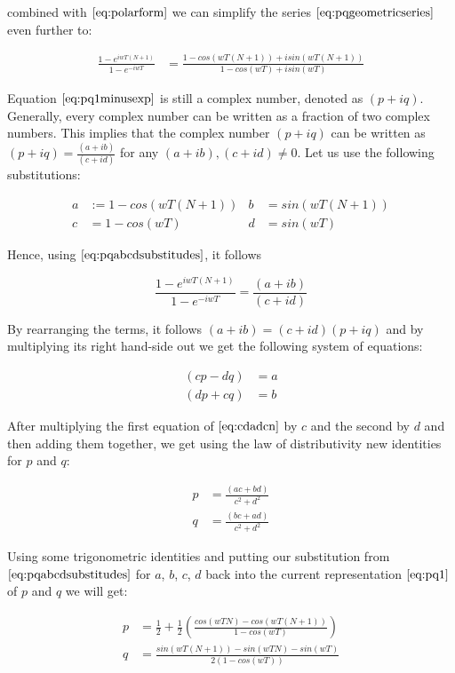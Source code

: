 combined with $\ref{eq:polarform}$ we can simplify the series $\ref{eq:pqgeometricseries}$ even further to:

\begin{align}
\frac{1-e^{iwT(N+1)}}{1-e^{-iwT}}
& =\frac{1-cos(wT(N+1)) + i sin(wT(N+1)) }{1-cos(wT) + i sin(wT)}
\label{eq:pq1minusexp}
\end{align}

Equation $\ref{eq:pq1minusexp}$ is still a complex number, denoted as $(p+iq)$. Generally, every complex number can be written as a fraction of two complex numbers. This implies that the complex number $(p+iq)$ can be written as $(p+iq) = \frac{(a+ib)}{(c+id)}$ for any $(a+ib), (c+id) \neq 0$. Let us use the following substitutions: 

\begin{align}
a& := 1 - cos(wT(N+1))&
b& =sin(wT(N+1)) \nonumber \\
c& =1-cos(wT)&
d& =sin(wT)
\label{eq:pqabcdsubstitudes}
\end{align}

Hence, using $\ref{eq:pqabcdsubstitudes}$, it follows 

\begin{equation}
  \frac{1-e^{iwT(N+1)}}{1-e^{-iwT}} = \frac{(a+ib)}{(c+id)}
\end{equation}

By rearranging the terms, it follows $(a+ib) = (c+id)(p+iq)$ and by multiplying its right hand-side out we get the following system of equations:

\begin{align}
(cp-dq)& =a \nonumber \\
(dp + cq)& =b
\label{eq:cdadcn}
\end{align}

After multiplying the first equation of $\ref{eq:cdadcn}$ by $c$ and the second by $d$ and then adding them together, we get using the law of distributivity new identities for $p$ and $q$:

\begin{align}
p& =\frac{(ac+bd)}{c^2 + d^2} \nonumber \\
q& =\frac{(bc+ad)}{c^2 + d^2}
\label{eq:pq1}
\end{align}

Using some trigonometric identities and putting our substitution from $\ref{eq:pqabcdsubstitudes}$ for $a$, $b$, $c$, $d$ back into the current representation $\ref{eq:pq1}$ of $p$ and $q$ we will get:

\begin{align}
p& =\frac{1}{2}+\frac{1}{2}\left(\frac{cos(wTN)-cos(wT(N+1))}{1-cos(wT)}\right) \nonumber \\
q& =\frac{sin(wT(N+1))-sin(wTN)-sin(wT)}{2(1-cos(wT))}
\end{align}

